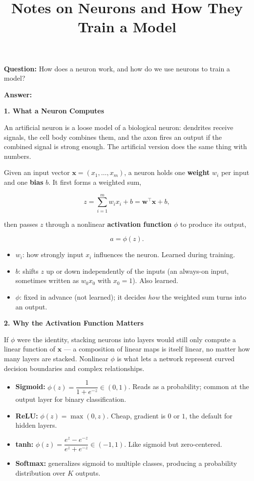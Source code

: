 \documentclass[conference]{IEEEtran}
\title{Notes on Neurons and How They Train a Model}
\author{
\IEEEauthorblockN{Luis Mendez}
}
\begin{document}
\maketitle

\textbf{Question:} How does a neuron work, and how do we use neurons to
train a model?

\bigskip

\textbf{Answer:}

\bigskip

\textbf{1. What a Neuron Computes}

An artificial neuron is a loose model of a biological neuron: dendrites
receive signals, the cell body combines them, and the axon fires an
output if the combined signal is strong enough. The artificial version
does the same thing with numbers.

Given an input vector $\mathbf{x} = (x_1, \dots, x_m)$, a neuron holds one
\textbf{weight} $w_i$ per input and one \textbf{bias} $b$. It first forms
a weighted sum,

\[
  z = \sum_{i=1}^{m} w_i x_i + b = \mathbf{w}^\top \mathbf{x} + b,
\]

then passes $z$ through a nonlinear \textbf{activation function} $\phi$ to
produce its output,

\[
  a = \phi(z).
\]

\begin{itemize}
    \item $w_i$: how strongly input $x_i$ influences the neuron. Learned
          during training.
    \item $b$: shifts $z$ up or down independently of the inputs (an
          always-on input, sometimes written as $w_0 x_0$ with $x_0=1$).
          Also learned.
    \item $\phi$: fixed in advance (not learned); it decides \emph{how}
          the weighted sum turns into an output.
\end{itemize}

\bigskip

\textbf{2. Why the Activation Function Matters}

If $\phi$ were the identity, stacking neurons into layers would still
only compute a linear function of $\mathbf{x}$ --- a composition of
linear maps is itself linear, no matter how many layers are stacked.
Nonlinear $\phi$ is what lets a network represent curved decision
boundaries and complex relationships.

\begin{itemize}
    \item \textbf{Sigmoid:} $\phi(z) = \dfrac{1}{1+e^{-z}} \in (0,1)$.
          Reads as a probability; common at the output layer for binary
          classification.
    \item \textbf{ReLU:} $\phi(z) = \max(0, z)$. Cheap, gradient is $0$
          or $1$, the default for hidden layers.
    \item \textbf{tanh:} $\phi(z) = \dfrac{e^z-e^{-z}}{e^z+e^{-z}} \in
          (-1,1)$. Like sigmoid but zero-centered.
    \item \textbf{Softmax:} generalizes sigmoid to multiple classes,
          producing a probability distribution over $K$ outputs.
\end{itemize}
\end{document}
